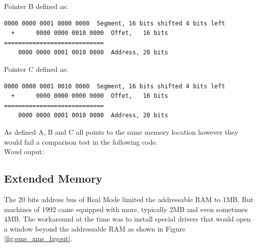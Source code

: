 \documentclass[book.tex]{subfiles}
\begin{document}
\bigskip

Pointer B defined as:
\begin{Verbatim}[fontsize=\relsize{-1}]
    0000 0000 0001 0000 0000  Segment, 16 bits shifted 4 bits left  
  +      0000 0000 0010 0000  Offet,   16 bits
============================
    0000 0000 0001 0010 0000  Address, 20 bits
\end{Verbatim}

\bigskip

Pointer C defined as:
\begin{Verbatim}[fontsize=\relsize{-1}]
    0000 0000 0001 0010 0000  Segment, 16 bits shifted 4 bits left  
  +      0000 0000 0000 0000  Offet,   16 bits
============================
    0000 0000 0001 0010 0000  Address, 20 bits
\end{Verbatim}

As defined A, B and C all points to the same memory location however they would fail a comparison test in the following code.\\



Woud ouput:




\bigskip





  \subsection{Extended Memory}

The 20 bits address bus of Real Mode limited the addressable RAM to 1MB. But machines of 1992 came equipped with more, typically 2MB and even sometimes 4MB. The workaround at the time was to install special drivers that would open a window beyond the addressable RAM as shown in Figure \ref{fig:ems_xms_layout}.
\end{document}
